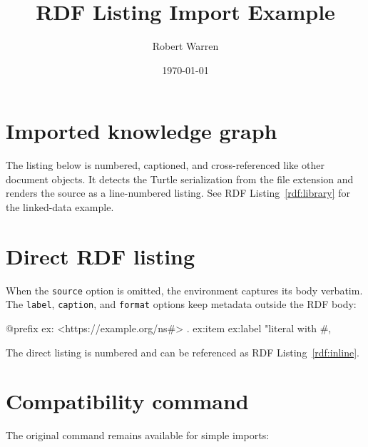 \documentclass[11pt,letterpaper]{article}
\title{RDF Listing Import Example}
\author{Robert Warren}
\date{\today}
\begin{document}
\listOfRDFfragments

\clearpage
{}
\maketitle

\section{Imported knowledge graph}

The listing below is numbered, captioned, and cross-referenced like other
document objects. It detects the Turtle serialization from the file extension
and renders the source as a line-numbered listing. See RDF Listing~\ref{rdf:library}
for the linked-data example.

\begin{rdfFragment}[
  source={doc/latex/RDFTools/examples/knowledge-graph.ttl},
  title={Library knowledge graph},
  show-source
]
\caption[Library knowledge graph]{A small linked-data example imported from a Turtle file.}
\label{rdf:library}
\end{rdfFragment}

\section{Direct RDF listing}

When the \texttt{source} option is omitted, the environment captures its body
verbatim. The \texttt{label}, \texttt{caption}, and \texttt{format} options keep
metadata outside the RDF body:

\begin{rdfFragment}[
  title={Inline Turtle example},
  format={Turtle},
  caption={A direct RDF listing},
  label={rdf:inline}
]
@prefix ex: <https://example.org/ns#> .
ex:item ex:label "literal with #, %
\end{rdfFragment}

The direct listing is numbered and can be referenced as RDF Listing~\ref{rdf:inline}.

\section{Compatibility command}

The original command remains available for simple imports:

\end{document}
